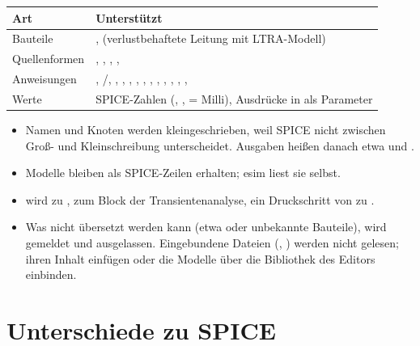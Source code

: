\begin{center}
\begin{tabularx}{\textwidth}{@{}lL@{}}
  \toprule
  Art & Unterstützt \\
  \midrule
  Bauteile & ,  (verlustbehaftete Leitung mit LTRA-Modell) \\
  Quellenformen & , , , ,  \\
  Anweisungen & , /, , , , , , , , , , , ,  \\
  Werte & SPICE-Zahlen (, ,  = Milli), Ausdrücke in  als Parameter \\
  \bottomrule
\end{tabularx}
\end{center}

\begin{itemize}
  \item Namen und Knoten werden kleingeschrieben, weil SPICE nicht zwischen
    Groß- und Kleinschreibung unterscheidet. Ausgaben heißen danach etwa
     und .
  \item Modelle bleiben als SPICE-Zeilen erhalten; esim liest sie selbst.
  \item {} wird zu ,  zum Block
     der Transientenanalyse, ein Druckschritt von
     zu .
  \item Was nicht übersetzt werden kann (etwa  oder unbekannte
    Bauteile), wird gemeldet und ausgelassen. Eingebundene Dateien
    (, ) werden nicht gelesen; ihren Inhalt
    einfügen oder die Modelle über die Bibliothek des Editors einbinden.
\end{itemize}

\section{Unterschiede zu SPICE}

